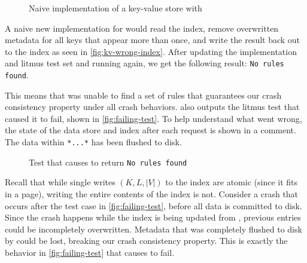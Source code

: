 \begin{figure}[h]
  \centering
  \vspace{-.5em}
  \caption{Naive implementation of a key-value store with \clean}
  \label{fig:kv-wrong-index}
\end{figure}

A naive new implementation for \clean would read the index, remove overwritten metadata for all keys that
appear more than once, and write the result back out to the index as seen in \autoref{fig:kv-wrong-index}.
After updating the implementation and litmus test set and running \depsynth again, we get the following result:
\texttt{No rules found}.

This means that \depsynth was unable to find a set of rules that guarantees our crash consistency
property under all crash behaviors. \depsynth also outputs the litmus test that caused it to fail,
shown in \autoref{fig:failing-test}. To help understand what went wrong, the state of the data store
and index after each request is shown in a comment. The data within \texttt{*...*} has been flushed to disk.

\begin{figure}[h]
  \centering
  \vspace{-.5em}
  \caption{Test that causes \depsynth to return \texttt{No rules found}}
  \label{fig:failing-test}
\end{figure}

Recall that while single writes $(K, L, |V|)$ to the index are atomic (since it fits in a page),
writing the entire contents of the index is not. Consider a crash that occurs after the test case in
\autoref{fig:failing-test}, before all data is committed to disk. Since the crash happens while the
index is being updated from \clean, previous entries could be incompletely overwritten. Metadata that
was completely flushed to disk by \flush could be lost, breaking our crash consistency property.
This is exactly the behavior in \autoref{fig:failing-test} that causes \depsynth to fail.

